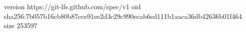 version https://git-lfs.github.com/spec/v1
oid sha256:7b057b16cb80b87cce91ee2d3c29c990ecab6ed111b1aaca36db42636b01f464
size 253597
